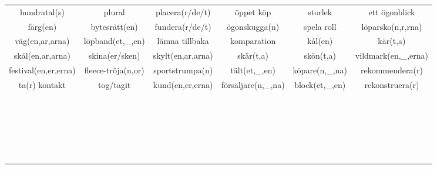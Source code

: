 \begin{center}
\begin{adjustwidth}{-2cm}{}
\begin{tabular}{|c c c c c c|}
            hundratal(s) & plural & placera(r/de/t) & öppet köp & storlek & ett ögonblick \\
            färg(en) & bytesrätt(en) & fundera(r/de/t) & ögonskugga(n) & spela roll & löparsko(n,r,rna) \\
            väg(en,ar,arna) & löpband(et,\_,en) & lämna tillbaka & komparation & kål(en) & kär(t,a) \\
            skål(en,ar,arna) & skina(er/sken) & skylt(en,ar,arna) & skär(t,a) & skön(t,a) & vildmark(en,\_,erna) \\
            festival(en,er,erna) & fleece-tröja(n,or) & sportstrumpa(n) & tält(et,\_,en) & köpare(n,\_,na) & rekommendera(r) \\
            ta(r) kontakt & tog/tagit & kund(en,er,erna) & försäljare(n,\_,na) & block(et,\_,en) & rekonstruera(r) \\
             &  &  &  &  &  \\
             &  &  &  &  &  \\
             &  &  &  &  &  \\
             &  &  &  &  &  \\
             &  &  &  &  &  \\
             &  &  &  &  &  \\
             &  &  &  &  &  \\
             &  &  &  &  &  \\
             &  &  &  &  &  \\
             &  &  &  &  &  \\
             &  &  &  &  &  \\
             &  &  &  &  &  \\
             &  &  &  &  &  \\
             &  &  &  &  &  \\
             &  &  &  &  &  \\
             &  &  &  &  &  \\
             &  &  &  &  &  \\
             &  &  &  &  &  \\
             &  &  &  &  &  \\
             &  &  &  &  &  \\
             &  &  &  &  &  \\
             &  &  &  &  &  \\
             &  &  &  &  &  \\
            \hline
        \end{tabular}
    \end{adjustwidth}
\end{center}

